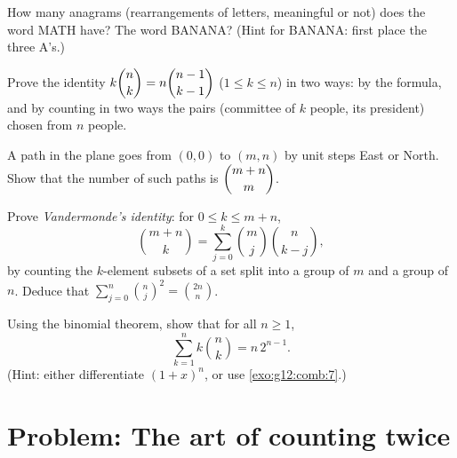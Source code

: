 \begin{exercise}[$\star\star$]\label{exo:g12:comb:6}
How many anagrams (rearrangements of letters, meaningful or not) does the
word MATH have? The word BANANA?
(Hint for BANANA: first place the three A's.)
\end{exercise}

\begin{exercise}[$\star\star$]\label{exo:g12:comb:7}
Prove the identity $k\dbinom{n}{k} = n\dbinom{n-1}{k-1}$ ($1 \leq k \leq n$)
in two ways: by the  formula, and by counting in two ways the pairs
(committee of $k$ people, its president) chosen from $n$ people.
\end{exercise}

\begin{exercise}[$\star\star$]\label{exo:g12:comb:8}
A path in the plane goes from $(0,0)$ to $(m, n)$ by unit steps East or
North. Show that the number of such paths is $\dbinom{m+n}{m}$.
\end{exercise}

\begin{exercise}[$\star\star\star$]\label{exo:g12:comb:9}
Prove \emph{Vandermonde's identity}: for $0 \leq k \leq m + n$,
\[
\binom{m+n}{k} = \sum_{j=0}^{k} \binom{m}{j}\binom{n}{k-j},
\]
by counting the $k$-element subsets of a set split into a group of $m$ and a
group of $n$. Deduce that
$\displaystyle\sum_{j=0}^{n}\binom{n}{j}^{\!2} = \binom{2n}{n}$.
\end{exercise}

\begin{exercise}[$\star\star\star$]\label{exo:g12:comb:10}
Using the binomial theorem, show that for all $n \geq 1$,
\[
\sum_{k=1}^{n} k \binom{n}{k} = n\,2^{n-1}.
\]
(Hint: either differentiate $(1+x)^n$, or use \cref{exo:g12:comb:7}.)
\end{exercise}

\section{Problem: The art of counting twice}

